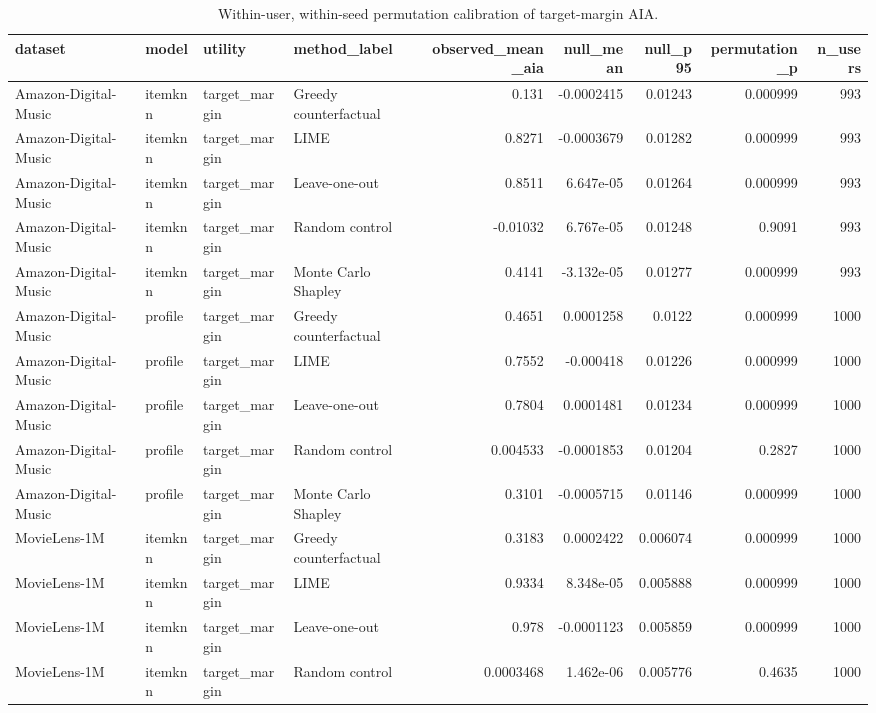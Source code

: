 \begin{table}[t]\centering
\caption{Within-user, within-seed permutation calibration of target-margin AIA.}\label{tab:aia-null}
\begin{tabular}{llllrrrrr}
\toprule
dataset & model & utility & method\_label & observed\_mean\_aia & null\_mean & null\_p95 & permutation\_p & n\_users \\
\midrule
Amazon-Digital-Music & itemknn & target\_margin & Greedy counterfactual & 0.131 & -0.0002415 & 0.01243 & 0.000999 & 993 \\
Amazon-Digital-Music & itemknn & target\_margin & LIME & 0.8271 & -0.0003679 & 0.01282 & 0.000999 & 993 \\
Amazon-Digital-Music & itemknn & target\_margin & Leave-one-out & 0.8511 & 6.647e-05 & 0.01264 & 0.000999 & 993 \\
Amazon-Digital-Music & itemknn & target\_margin & Random control & -0.01032 & 6.767e-05 & 0.01248 & 0.9091 & 993 \\
Amazon-Digital-Music & itemknn & target\_margin & Monte Carlo Shapley & 0.4141 & -3.132e-05 & 0.01277 & 0.000999 & 993 \\
Amazon-Digital-Music & profile & target\_margin & Greedy counterfactual & 0.4651 & 0.0001258 & 0.0122 & 0.000999 & 1000 \\
Amazon-Digital-Music & profile & target\_margin & LIME & 0.7552 & -0.000418 & 0.01226 & 0.000999 & 1000 \\
Amazon-Digital-Music & profile & target\_margin & Leave-one-out & 0.7804 & 0.0001481 & 0.01234 & 0.000999 & 1000 \\
Amazon-Digital-Music & profile & target\_margin & Random control & 0.004533 & -0.0001853 & 0.01204 & 0.2827 & 1000 \\
Amazon-Digital-Music & profile & target\_margin & Monte Carlo Shapley & 0.3101 & -0.0005715 & 0.01146 & 0.000999 & 1000 \\
MovieLens-1M & itemknn & target\_margin & Greedy counterfactual & 0.3183 & 0.0002422 & 0.006074 & 0.000999 & 1000 \\
MovieLens-1M & itemknn & target\_margin & LIME & 0.9334 & 8.348e-05 & 0.005888 & 0.000999 & 1000 \\
MovieLens-1M & itemknn & target\_margin & Leave-one-out & 0.978 & -0.0001123 & 0.005859 & 0.000999 & 1000 \\
MovieLens-1M & itemknn & target\_margin & Random control & 0.0003468 & 1.462e-06 & 0.005776 & 0.4635 & 1000 \\

\end{tabular}
\end{table}
